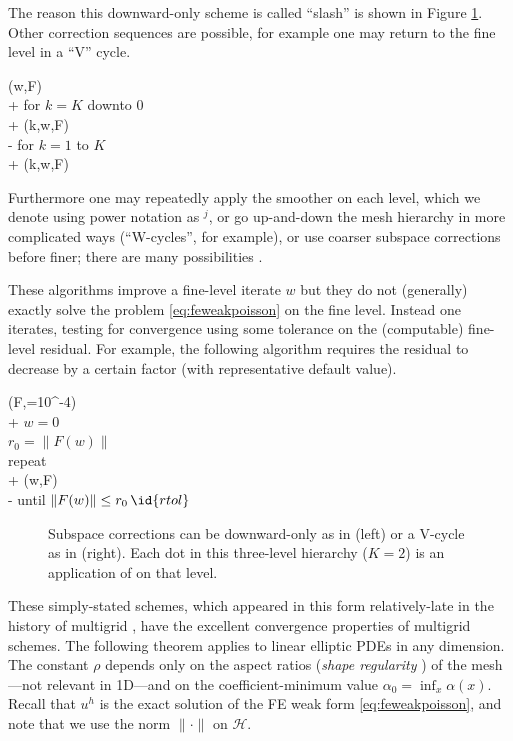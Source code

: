 \documentclass[letterpaper,final,12pt,reqno]{amsart}
\theoremstyle{claim}
\numberwithin{equation}{section}
\numberwithin{figure}{section}
\numberwithin{table}{section}
\begin{document}
The reason this downward-only scheme is called ``slash'' is shown in Figure \ref{fig:msccycles}.  Other correction sequences are possible, for example one may return to the fine level in a ``V'' cycle.
\begin{pseudo*}
(w,F)\text{:} \\+
    for $k=K$ downto $0$ \\+
        (k,w,F) \\-
    for $k=1$ to $K$ \\+
        (k,w,F)
\end{pseudo*}
Furthermore one may repeatedly apply the smoother on each level, which we denote using power notation as $^j$, or go up-and-down the mesh hierarchy in more complicated ways (``W-cycles'', for example), or use coarser subspace corrections before finer; there are many possibilities \cite{Trottenbergetal2001}.

These  algorithms improve a fine-level iterate $w$ but they do not (generally) exactly solve the problem \eqref{eq:feweakpoisson} on the fine level.  Instead one iterates, testing for convergence using some tolerance on the (computable) fine-level residual.  For example, the following algorithm requires the residual to decrease by a certain factor (with representative default value).
\begin{pseudo*}
(F,=10^{-4})\text{:} \\+
    $w=0$ \qquad\qquad\qquad\qquad\qquad {} \\
    $r_0 = \|F(w)\|$ \\
    repeat \\+
        (w,F) \qquad\qquad {} \\-
    until $\|F(w)\| \le r_0\, \id{rtol}$
\end{pseudo*}

\begin{figure}

\caption{Subspace corrections can be downward-only as in  (left) or a V-cycle as in  (right).  Each dot in this three-level hierarchy ($K=2$) is an application of  on that level.}
\label{fig:msccycles}
\end{figure}

These simply-stated schemes, which appeared in this form relatively-late in the history of multigrid \cite{Xu1992}, have the excellent convergence properties of multigrid schemes.  The following theorem applies to linear elliptic PDEs in any dimension.  The constant $\rho$ depends only on the aspect ratios (\emph{shape regularity} \cite{Elmanetal2014}) of the mesh---not relevant in 1D---and on the coefficient-minimum value $\alpha_0=\inf_x \alpha(x)$.  Recall that $u^h$ is the exact solution of the FE weak form \eqref{eq:feweakpoisson}, and note that we use the norm $\|\cdot\|$ on $\mathcal{H}$.
\end{document}
